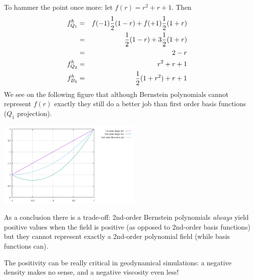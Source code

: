 To hammer the point once more: let $f(r)=r^2+r+1$.
Then 
\begin{eqnarray}
f^h_{Q_1} 
&=& f(-1) \frac{1}{2}(1-r) + f(+1) \frac{1}{2}(1+r) \nonumber\\
&=&  \frac{1}{2}(1-r) + 3 \frac{1}{2}(1+r) \nonumber\\
&=& 2-r \\
f^h_{Q_2} &=& r^2+r+1 \\
f^h_{B_2} &=& \frac{1}{2} (1+r^2)+r+1 
\end{eqnarray}
We see on the following figure that although Bernstein polynomials cannot 
represent $f(r)$ exactly they still do a better job than first order basis functions
($Q_1$ projection).
\begin{center}
\includegraphics[width=7cm]{images/bernstein/hammer.pdf}
\end{center}

As a conclusion there is a trade-off: 2nd-order Bernstein polynomials {\it always} yield positive 
values when the field is positive (as opposed to 2nd-order basis functions) but they cannot 
represent exactly a 2nd-order polynomial field (while basis functions can).

The positivity can be really critical in geodynamical simulations: a negative density makes no sense, 
and a negative viscosity even less!

